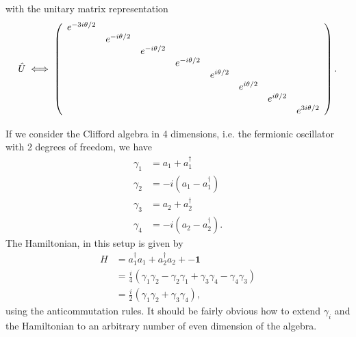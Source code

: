 \documentclass{../mathnotes}
\begin{document}
with the unitary matrix representation
\begin{align*}
    \hat U \iff
    \left(
    \begin{array}[]{cccccccc}
        e^{-3i\theta/2} &  &  &  &  &  &  & \\
         & e^{-i\theta/2} &  &  &  &  &  & \\
         &  & e^{-i\theta/2} &  &  &  &  & \\
         &  &  & e^{-i\theta/2} &  &  &  & \\
         &  &  &  & e^{i\theta/2} &  &  & \\
         &  &  &  &  & e^{i\theta/2} &  & \\
         &  &  &  &  &  & e^{i\theta/2} & \\
         &  &  &  &  &  &  & e^{3i\theta/2}\\
    \end{array}
    \right).
\end{align*}

If we consider the Clifford algebra in 4 dimensions, i.e. the fermionic oscillator with 2 degrees of freedom, we have
\begin{align*}
    \gamma_1&=a_1+a_1^\dagger\\
    \gamma_2&=-i(a_1-a_1^\dagger)\\
    \gamma_3&=a_2+a_2^\dagger\\
    \gamma_4&=-i(a_2-a_2^\dagger).
\end{align*}
The Hamiltonian, in this setup is given by
\begin{align*}
    H&=a_1^\dagger a_1 + a_2^\dagger a_2 + -\mathbf{1}\\
    &=\frac{i}{4}\left( \gamma_1\gamma_2-\gamma_2\gamma_1+\gamma_3\gamma_4-\gamma_4\gamma_3 \right)\\
    &=\frac{i}{2}\left( \gamma_1\gamma_2+\gamma_3\gamma_4 \right),
\end{align*}
using the anticommutation rules.
It should be fairly obvious how to extend $\gamma_i$ and the Hamiltonian to an arbitrary number of even dimension of the algebra.
\end{document}
